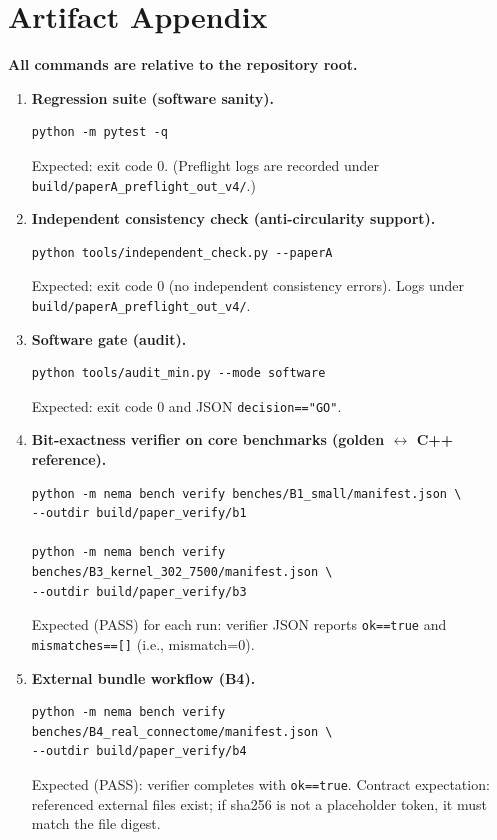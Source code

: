 \appendix
\section{Artifact Appendix}

\textbf{All commands are relative to the repository root.}

\begin{enumerate}
\item \textbf{Regression suite (software sanity).}
\begin{verbatim}
python -m pytest -q
\end{verbatim}
Expected: exit code 0. (Preflight logs are recorded under \texttt{build/paperA\_preflight\_out\_v4/}.)

\item \textbf{Independent consistency check (anti-circularity support).}
\begin{verbatim}
python tools/independent_check.py --paperA
\end{verbatim}
Expected: exit code 0 (no independent consistency errors). Logs under \texttt{build/paperA\_preflight\_out\_v4/}.

\item \textbf{Software gate (audit).}
\begin{verbatim}
python tools/audit_min.py --mode software
\end{verbatim}
Expected: exit code 0 and JSON \texttt{decision=="GO"}.

\item \textbf{Bit-exactness verifier on core benchmarks (golden \texorpdfstring{$\leftrightarrow$}{<->} C++ reference).}
\begin{verbatim}
python -m nema bench verify benches/B1_small/manifest.json \
--outdir build/paper_verify/b1

python -m nema bench verify benches/B3_kernel_302_7500/manifest.json \
--outdir build/paper_verify/b3
\end{verbatim}
Expected (PASS) for each run: verifier JSON reports \texttt{ok==true} and \texttt{mismatches==[]} (i.e., mismatch=0).

\item \textbf{External bundle workflow (B4).}
\begin{verbatim}
python -m nema bench verify benches/B4_real_connectome/manifest.json \
--outdir build/paper_verify/b4
\end{verbatim}
Expected (PASS): verifier completes with \texttt{ok==true}. Contract expectation: referenced external files exist; if sha256 is not a placeholder token, it must match the file digest.


\end{enumerate}
